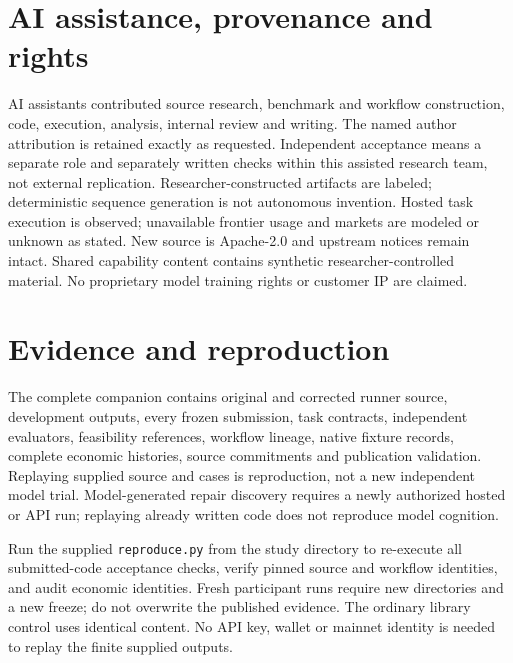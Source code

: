 \documentclass[11pt,letterpaper]{article}
\begin{document}
\section*{AI assistance, provenance and rights}
AI assistants contributed source research, benchmark and workflow construction, code, execution, analysis, internal review and writing. The named author attribution is retained exactly as requested. Independent acceptance means a separate role and separately written checks within this assisted research team, not external replication. Researcher-constructed artifacts are labeled; deterministic sequence generation is not autonomous invention. Hosted task execution is observed; unavailable frontier usage and markets are modeled or unknown as stated. New source is Apache-2.0 and upstream notices remain intact. Shared capability content contains synthetic researcher-controlled material. No proprietary model training rights or customer IP are claimed.

\appendix
\section{Evidence and reproduction}
The complete companion contains original and corrected runner source, development outputs, every frozen submission, task contracts, independent evaluators, feasibility references, workflow lineage, native fixture records, complete economic histories, source commitments and publication validation. Replaying supplied source and cases is reproduction, not a new independent model trial. Model-generated repair discovery requires a newly authorized hosted or API run; replaying already written code does not reproduce model cognition.

Run the supplied \texttt{reproduce.py} from the study directory to re-execute all submitted-code acceptance checks, verify pinned source and workflow identities, and audit economic identities. Fresh participant runs require new directories and a new freeze; do not overwrite the published evidence. The ordinary library control uses identical content. No API key, wallet or mainnet identity is needed to replay the finite supplied outputs.


\end{document}
